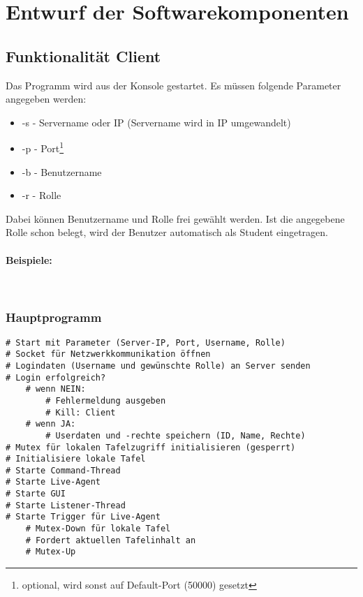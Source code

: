 \section{Entwurf der Softwarekomponenten}


\subsection{Funktionalität Client}
Das Programm wird aus der Konsole gestartet. Es müssen folgende Parameter angegeben werden:
\begin{itemize}
	\item -s - Servername oder IP (Servername wird in IP umgewandelt)
	\item -p - Port\footnote{optional, wird sonst auf Default-Port (50000) gesetzt}
	\item -b - Benutzername
	\item -r - Rolle
\end{itemize}

Dabei können Benutzername und Rolle frei gewählt werden. Ist die angegebene Rolle schon belegt, wird der Benutzer automatisch als Student eingetragen.

\paragraph*{Beispiele: \\}
 \\

\subsubsection{Hauptprogramm}
\begin{lstlisting}
# Start mit Parameter (Server-IP, Port, Username, Rolle)
# Socket für Netzwerkkommunikation öffnen
# Logindaten (Username und gewünschte Rolle) an Server senden
# Login erfolgreich?
    # wenn NEIN: 
        # Fehlermeldung ausgeben
        # Kill: Client
    # wenn JA:
        # Userdaten und -rechte speichern (ID, Name, Rechte)
# Mutex für lokalen Tafelzugriff initialisieren (gesperrt)
# Initialisiere lokale Tafel
# Starte Command-Thread
# Starte Live-Agent
# Starte GUI
# Starte Listener-Thread
# Starte Trigger für Live-Agent
    # Mutex-Down für lokale Tafel
    # Fordert aktuellen Tafelinhalt an
    # Mutex-Up
\end{lstlisting}

